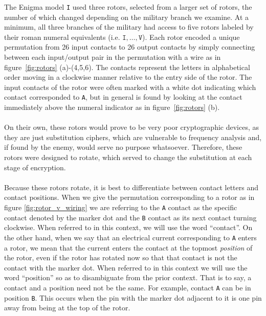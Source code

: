 The Enigma model \texttt{I} used three rotors, selected from a larger
set of rotors, the number of which changed depending on the military
branch we examine. At a minimum, all three branches of the military
had access to five rotors labeled by their roman numeral equivalents (i.e. $\texttt{I},\dots,\texttt{V}$).
Each rotor encoded a unique permutation from 26 input contacts to 26
output contacts by simply connecting between each input/output pair
in the permutation with a wire as in figure~\ref{fig:rotors} (a)-(4,5,6). The contacts represent the letters
in alphabetical order moving in a clockwise manner relative to the
entry side of the rotor. The input contacts of the rotor were often marked
with a white dot indicating which contact corresponded to \texttt{A},
but in general is found by looking at the contact immediately above
the numeral indicator as in figure~\ref{fig:rotors} (b).
\\\\On their own, these rotors would prove to be very poor
cryptographic devices, as they are just substitution ciphers, which are
vulnerable to frequency analysis and, if found by the enemy, would
serve no purpose whatsoever. Therefore, these rotors were designed to
rotate, which served to change the substitution at each stage of encryption.
\\\\Because these rotors rotate, it is best to differentiate between
contact letters and contact positions. When we give the permutation
corresponding to a rotor as in figure \ref{fig:rotor_v_wiring} we are
referring to the \texttt{A} contact as the specific contact denoted
by the marker dot and the \texttt{B} contact as its next contact
turning clockwise. When referred to in this context, we will use the
word ``contact''. On the other hand, when we say that an electrical
current corresponding to \texttt{A} enters a rotor, we mean
that the current enters the contact at the topmost \emph{position} of
the rotor, even if the rotor has rotated now so that that contact
is not the contact with the marker dot. When referred to in this
context we will use the word ``position'' so as to disambiguate from
the prior context. That is to say, a contact and a position need not
be the same. For example, contact \texttt{A} can be in position
\texttt{B}. This occurs when the pin with the marker dot adjacent to
it is one pin away from being at the top of the rotor.

